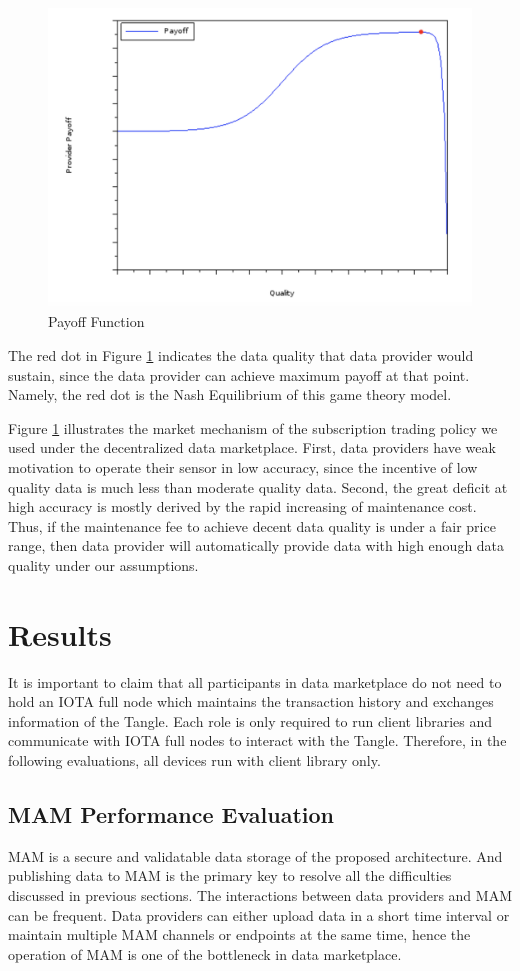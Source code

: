 \documentclass[journal,article,applsci,submit,moreauthors,pdftex]{Definitions/mdpi}
\begin{document}
\begin{figure}[H] \centering \includegraphics[width=3.3 in]{payoff_pic} \caption{Payoff Function}
    \label{fig:payoff_pic} \end{figure}

The red dot in Figure \ref{fig:payoff_pic} indicates the data quality that data provider would sustain, since the data provider can achieve maximum payoff at that point. Namely, the red dot is the Nash Equilibrium of this game theory model.

Figure \ref{fig:payoff_pic} illustrates the market mechanism of the subscription trading policy we used under the decentralized data marketplace. First, data providers have weak motivation to operate their sensor in low accuracy, since the incentive of low quality data is much less than moderate quality data. Second, the great deficit at high accuracy is mostly derived by the rapid increasing of maintenance cost. Thus, if the maintenance fee to achieve decent data quality is under a fair price range, then data provider will automatically provide data with high enough data quality under our assumptions.


\section{Results}
It is important to claim that all participants in data marketplace do not need to hold an IOTA full node which maintains the transaction history and exchanges information of the Tangle. Each role is only required to run client libraries and communicate with IOTA full nodes to interact with the Tangle. Therefore, in the following evaluations, all devices run with client library only.

\subsection{MAM Performance Evaluation}
MAM is a secure and validatable data storage of the proposed architecture. And publishing data to MAM is the primary key to resolve all the difficulties discussed in previous sections. The interactions between data providers and MAM can be frequent. Data providers can either upload data in a short time interval or maintain multiple MAM channels or endpoints at the same time, hence the operation of MAM is one of the bottleneck in data marketplace.
\end{document}
